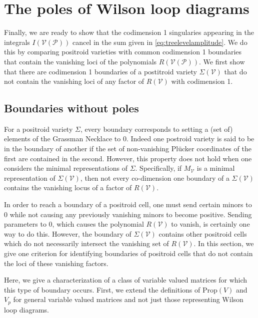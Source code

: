 \documentclass[11pt]{article}
\newcommand{\cP}{\mathcal{P}}
\newcommand{\cV}{\mathcal{V}}
\newcommand{\VP}{\cV(\cP)}
\newcommand{\Prop}{\textrm{Prop}}
\theoremstyle{remark}
\theoremstyle{definition}
\begin{document}
\section{The poles of Wilson loop diagrams \label{sec:poles}}

Finally, we are ready to show that the codimension 1 singularies appearing in the integrals $I(\VP)$ cancel in the sum given in \eqref{eq:treelevelamplitude}. We do this by comparing positroid varieties with common codimension 1 boundaries that contain the vanishing loci of the polynomials $R(\VP)$. We first show that there are codimension 1 boundaries of a postitroid variety $\Sigma(\cV)$ that do not contain the vanishing loci of any factor of $R(\cV)$ with codimension 1. 

\subsection{Boundaries without poles \label{sec:boundarysanspoles}}

For a positroid variety $\Sigma$, every boundary corresponds to setting a (set of) elements of the Grassman Necklace to 0. Indeed one postroid variety is said to be in the boundary of another if the set of non-vanishing Pl{\"u}cker coordinates of the first are contained in the second. However, this property does not hold when one considers the minimal representations of $\Sigma$. Specifically, if $M_\cV$ is a minimal representation of $\Sigma(\cV)$, then not every co-dimension one boundary of a $\Sigma(\cV)$ contains the vanishing locus of a factor of $R(\cV)$. 

In order to reach a boundary of a positroid cell, one must send certain minors to 0 while not causing any previously vanishing minors to become positive. Sending parameters to $0$, which causes the polynomial $R(\cV)$ to vanish, is certainly one way to do this. However, the boundary of $\Sigma(\cV)$ contains other positroid cells which do not necessarily intersect the vanishing set of $R(\cV)$. In this section, we give one criterion for identifying boundaries of positroid cells that do not contain the loci of these vanishing factors. 

Here, we give a characterization of a class of variable valued matrices for which this type of boundary occurs. First, we extend the definitions of $\Prop(V)$ and $V_p$ for general variable valued matrices and not just those representing Wilson loop diagrams.
\end{document}
